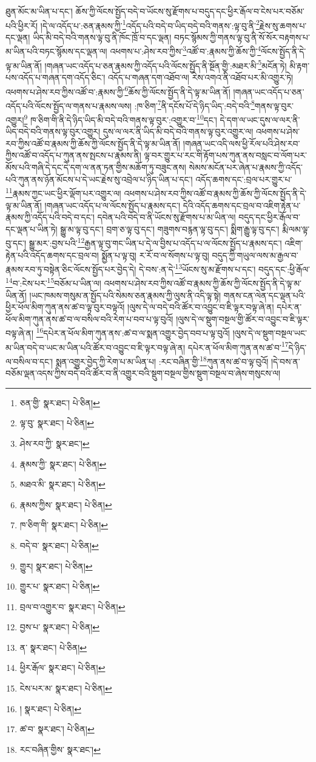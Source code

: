 ཐུན་མོང་མ་ཡིན་པ་དང་། ཆོས་ཀྱི་ལོངས་སྤྱོད་བདེ་བ་ཡོངས་སུ་རྫོགས་པ་བདུད་དང་ཕྱིར་རྒོལ་བ་ངེས་པར་བཅོམ་པའི་ཕྱིར་རོ། །དེ་ལ་འདོད་པ་:ཅན་རྣམས་ཀྱི་\footnote{ཅན་གྱི་  སྣར་ཐང་།  པེ་ཅིན། }འདོད་པའི་བདེ་བ་ཡིད་བདེ་བའི་གནས་:ལྟ་བུ་ནི་\footnote{ལྟ་བུ་  སྣར་ཐང་།  པེ་ཅིན། }རྗེས་སུ་ཆགས་པ་དང་ལྡན། ཡིད་མི་བདེ་བའི་གནས་ལྟ་བུ་ནི་ཁོང་ཁྲོ་བ་དང་ལྡན། བཏང་སྙོམས་ཀྱི་གནས་ལྟ་བུ་ནི་སོ་སོར་བརྟགས་པ་མ་ཡིན་པའི་བཏང་སྙོམས་དང་ལྡན་ལ། འཕགས་པ་:ཤེས་རབ་ཀྱིས་\footnote{ཤེས་རབ་ཀྱི་  སྣར་ཐང་། }འཚོ་བ་:རྣམས་ཀྱི་ཆོས་ཀྱི་\footnote{རྣམས་ཀྱི་  སྣར་ཐང་།  པེ་ཅིན། }ལོངས་སྤྱོད་ནི་དེ་ལྟ་མ་ཡིན་ནོ། །གཞན་ཡང་འདོད་པ་ཅན་རྣམས་ཀྱི་འདོད་པའི་ལོངས་སྤྱོད་ནི་སྔོན་གྱི་:མཐར་མི་\footnote{མཐའ་མི་  སྣར་ཐང་།  པེ་ཅིན། }མངོན་ཏེ། མི་རྟག་པས་འདོད་པ་གཞན་དག་འདོད་ཅིང་། འདོད་པ་གཞན་དག་འཐོབ་ལ། རེས་འགའ་ནི་འཐོབ་པར་མི་འགྱུར་ཏེ། འཕགས་པ་ཤེས་རབ་ཀྱིས་འཚོ་བ་:རྣམས་ཀྱི་\footnote{རྣམས་ཀྱིས་  སྣར་ཐང་།  པེ་ཅིན། }ཆོས་ཀྱི་ལོངས་སྤྱོད་ནི་དེ་ལྟ་མ་ཡིན་ནོ། །གཞན་ཡང་འདོད་པ་ཅན་འདོད་པའི་ལོངས་སྤྱོད་ལ་གནས་པ་རྣམས་ལས། :ཁ་ཅིག་\footnote{ཁ་ཅིག་གི་  སྣར་ཐང་།  པེ་ཅིན། }ནི་དངོས་པོ་དེ་ཉིད་ཡིད་:བདེ་བའི་\footnote{བདེ་བ་  སྣར་ཐང་།  པེ་ཅིན། }གནས་ལྟ་བུར་འགྱུར།\footnote{གྱུར།  སྣར་ཐང་།  པེ་ཅིན། } ཁ་ཅིག་གི་ནི་དེ་ཉིད་ཡིད་མི་བདེ་བའི་གནས་ལྟ་བུར་:འགྱུར་བ་\footnote{གྱུར་པ་  སྣར་ཐང་།  པེ་ཅིན། }དང་། དེ་དག་ལ་ཡང་དུས་ལ་ལར་ནི་ཡིད་བདེ་བའི་གནས་ལྟ་བུར་འགྱུར། དུས་ལ་ལར་ནི་ཡིད་མི་བདེ་བའི་གནས་ལྟ་བུར་འགྱུར་ལ། འཕགས་པ་ཤེས་རབ་ཀྱིས་འཚོ་བ་རྣམས་ཀྱི་ཆོས་ཀྱི་ལོངས་སྤྱོད་ནི་དེ་ལྟ་མ་ཡིན་ནོ། །གཞན་ཡང་འདི་ལས་ཕྱི་རོལ་པའི་ཤེས་རབ་ཀྱིས་འཚོ་བ་འདོད་པ་ཀུན་ནས་སྤངས་པ་རྣམས་ནི། ལྟ་བར་གྱུར་པ་རང་གི་རྟོག་པས་ཀུན་ནས་བསླང་བ་ལོག་པར་མོས་པའི་གཞི་དེ་དང་དེ་དག་ལ་ནན་ཏན་གྱིས་མཆོག་ཏུ་བཟུང་ནས། སེམས་མངོན་པར་ཞེན་པ་རྣམས་ཀྱི་འདོད་པའི་ཀུན་ནས་ཉོན་མོངས་པ་དེ་ཡང་རྗེས་སུ་འབྲེལ་པ་ཉིད་ཡིན་པ་དང་། འདོད་ཆགས་དང་:བྲལ་པར་གྱུར་པ་\footnote{བྲལ་བ་འགྱུར་བ་  སྣར་ཐང་།  པེ་ཅིན། }རྣམས་ཀྱང་ཡང་ཕྱིར་ལྡོག་པར་འགྱུར་ལ། འཕགས་པ་ཤེས་རབ་ཀྱིས་འཚོ་བ་རྣམས་ཀྱི་ཆོས་ཀྱི་ལོངས་སྤྱོད་ནི་དེ་ལྟ་མ་ཡིན་ནོ། །གཞན་ཡང་འདོད་པ་ལ་ལོངས་སྤྱོད་པ་རྣམས་དང་། དེའི་འདོད་ཆགས་དང་བྲལ་བ་འཇིག་རྟེན་པ་རྣམས་ཀྱི་འདོད་པའི་བདེ་བ་དང་། དབེན་པའི་བདེ་བ་ནི་ཡོངས་སུ་རྫོགས་པ་མ་ཡིན་ལ། བདུད་དང་ཕྱིར་རྒོལ་བ་དང་ལྡན་པ་ཡིན་ཏེ། སྒྱུ་མ་ལྟ་བུ་དང་། བྲག་ཅ་ལྟ་བུ་དང་། གཟུགས་བརྙན་ལྟ་བུ་དང་། སྨིག་རྒྱུ་ལྟ་བུ་དང་། རྨི་ལམ་ལྟ་བུ་དང་། སྒྱུ་མར་:བྱས་པའི་\footnote{བྱས་པ་  སྣར་ཐང་།  པེ་ཅིན། }རྒྱན་ལྟ་བུ་གང་ཡིན་པ་དེ་ལ་བྱིས་པ་འདོད་པ་ལ་ལོངས་སྤྱོད་པ་རྣམས་དང་། འཇིག་རྟེན་པའི་འདོད་ཆགས་དང་བྲལ་བ། སྨྱོན་པ་ལྟ་བུ། ར་རོ་བ་ལ་སོགས་པ་ལྟ་བུ། བདུད་ཀྱི་གཡུལ་ལས་མ་རྒྱལ་བ་རྣམས་རབ་ཏུ་བསྟེན་ཅིང་ལོངས་སྤྱོད་པར་བྱེད་དེ། དེ་བས་:ན་དེ་\footnote{ན་  སྣར་ཐང་།  པེ་ཅིན། }ཡོངས་སུ་མ་རྫོགས་པ་དང་། བདུད་དང་:ཕྱི་རྒོལ་\footnote{ཕྱིར་རྒོལ་  སྣར་ཐང་།  པེ་ཅིན། }བ་:ངེས་པར་\footnote{ངེས་པར་མ་  སྣར་ཐང་།  པེ་ཅིན། }བཅོམ་པ་ཡིན་ལ། འཕགས་པ་ཤེས་རབ་ཀྱིས་འཚོ་བ་རྣམས་ཀྱི་ཆོས་ཀྱི་ལོངས་སྤྱོད་ནི་དེ་ལྟ་མ་ཡིན་ནོ། །ཡང་ཁམས་གསུམ་ན་སྤྱོད་པའི་སེམས་ཅན་རྣམས་ཀྱི་ལུས་ནི་འདི་ལྟ་སྟེ། གནས་ངན་ལེན་དང་ལྡན་པའི་ཕྱིར་ཕོལ་མིག་ཀུན་ནས་ཚ་བ་ལྟ་བུར་བལྟའོ། །ལུས་དེ་ལ་བདེ་བའི་ཚོར་བ་འབྱུང་བ་ཇི་ལྟར་བལྟ་ཞེ་ན། དཔེར་ན་ཕོལ་མིག་ཀུན་ནས་ཚ་བ་ལ་བསིལ་བའི་རེག་པ་བབ་པ་ལྟ་བུའོ། །ལུས་དེ་ལ་སྡུག་བསྔལ་གྱི་ཚོར་བ་འབྱུང་བ་ཇི་ལྟར་བལྟ་ཞེ་ན། \footnote{།    སྣར་ཐང་།  པེ་ཅིན། }དཔེར་ན་ཕོལ་མིག་ཀུན་ནས་:ཚ་བ་ལ་སྨན་འགྱུར་བྱེད་བབ་པ་ལྟ་བུའོ། །ལུས་དེ་ལ་སྡུག་བསྔལ་ཡང་མ་ཡིན་བདེ་བ་ཡང་མ་ཡིན་པའི་ཚོར་བ་འབྱུང་བ་ཇི་ལྟར་བལྟ་ཞེ་ན། དཔེར་ན་ཕོལ་མིག་ཀུན་ནས་ཚ་བ་\footnote{ཚ་བ་  སྣར་ཐང་།  པེ་ཅིན། }དེ་ཉིད་ལ་བསིལ་བ་དང་། སྨན་འགྱུར་བྱེད་ཀྱི་རེག་པ་མ་ཡིན་པ། :རང་བཞིན་གྱི་\footnote{རང་བཞིན་གྱིས་  སྣར་ཐང་། }ཀུན་ནས་ཚ་བ་ལྟ་བུའོ། །དེ་བས་ན་བཅོམ་ལྡན་འདས་ཀྱིས་བདེ་བའི་ཚོར་བ་ནི་འགྱུར་བའི་སྡུག་བསྔལ་གྱིས་སྡུག་བསྔལ་བ་ཞེས་གསུངས་ལ། 